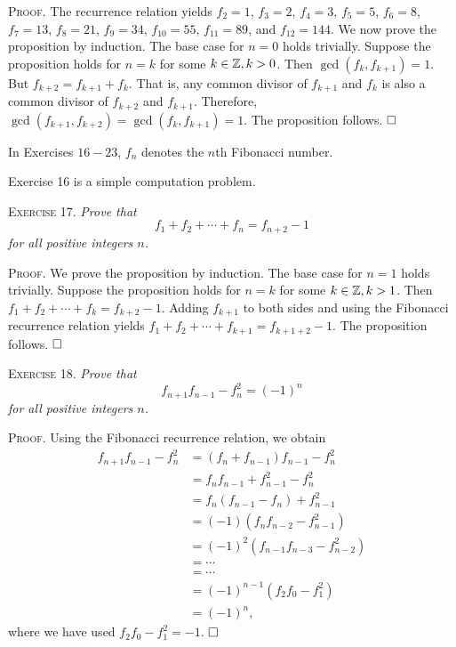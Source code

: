 \documentclass[11pt, leqno]{article}
\newcommand{\done}{\ensuremath{\hfill\square}}
\begin{document}
\textsc{Proof}. The recurrence relation yields $f_2=1$, $f_3=2$, $f_4=3$, $f_5 = 5$, $f_6 = 8$, $f_7 = 13$, $f_8 = 21$, $f_9 = 34$, $f_{10} = 55$, $f_{11} = 89$, and $f_{12} = 144$. We now prove the proposition by induction. The base case for $n=0$ holds trivially. Suppose the proposition holds for $n=k$ for some $k\in\mathbb{Z}, k>0$. Then $\gcd(f_k, f_{k+1}) = 1$. But $f_{k+2} = f_{k+1} + f_k$. That is, any common divisor of $f_{k+1}$ and $f_k$ is also a common divisor of $f_{k+2}$ and $f_{k+1}$. Therefore, $\gcd(f_{k+1}, f_{k+2}) = \gcd(f_k, f_{k+1}) = 1$. The proposition follows. \done

In Exercises $16-23$, $f_n$ denotes the $n$th Fibonacci number.

Exercise 16 is a simple computation problem.

\textsc{Exercise 17}. \emph{Prove that 
\begin{displaymath}
f_1 + f_2 + \cdots + f_n = f_{n+2} - 1
\end{displaymath}
for all positive integers $n$.}

\textsc{Proof}. We prove the proposition by induction. The base case for $n=1$ holds trivially. Suppose the proposition holds for $n=k$ for some $k\in\mathbb{Z}, k>1$. Then $f_1 + f_2 + \cdots + f_k = f_{k+2} - 1$. Adding $f_{k+1}$ to both sides and using the Fibonacci recurrence relation yields $f_1 + f_2 + \cdots + f_{k+1} = f_{k+1+2} - 1$. The proposition follows. \done

\textsc{Exercise 18}. \emph{Prove that 
\begin{displaymath}
f_{n+1}f_{n-1} - f_n^2 = (-1)^n
\end{displaymath}
for all positive integers $n$.}

\textsc{Proof}. Using the Fibonacci recurrence relation, we obtain 
\begin{align*}
  f_{n+1}f_{n-1} - f_n^2 &= (f_n+f_{n-1})f_{n-1} - f_n^2 \\
                         &= f_nf_{n-1} + f_{n-1}^2 - f_n^2 \\
                         &= f_n(f_{n-1} - f_n) + f_{n-1}^2 \\
                         &= (-1)(f_nf_{n-2} - f_{n-1}^2) \\
                         &= (-1)^2(f_{n-1}f_{n-3} - f_{n-2}^2) \\
                         &= \cdots \\
                         &= \cdots \\
                         &= (-1)^{n-1}(f_2f_0 - f_1^2) \\
  &= (-1)^n,
\end{align*}
where we have used $f_2f_0-f_1^2 = -1$. \done
\end{document}
